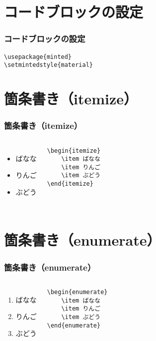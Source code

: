 \documentclass[t,aspectratio=169]{beamer}
\begin{document}
\section{コードブロックの設定}
\begin{frame}[fragile]
    \frametitle{コードブロックの設定}
    \begin{verbatim}
\usepackage{minted}
\setmintedstyle{material}
    \end{verbatim}
\end{frame}

\section{箇条書き（itemize）}
\begin{frame}[fragile]
    \frametitle{箇条書き（itemize）}
    \begin{columns}
        \begin{itemize}
            \item ばなな
            \item りんご
            \item ぶどう
        \end{itemize}
        \begin{verbatim}
\begin{itemize}
    \item ばなな
    \item りんご
    \item ぶどう
\end{itemize}
        \end{verbatim}
    \end{columns}
\end{frame}

\section{箇条書き（enumerate）}
\begin{frame}[fragile]
    \frametitle{箇条書き（enumerate）}
    \begin{columns}
        \begin{enumerate}
            \item ばなな
            \item りんご
            \item ぶどう
        \end{enumerate}
        \begin{verbatim}
\begin{enumerate}
    \item ばなな
    \item りんご
    \item ぶどう
\end{enumerate}
        \end{verbatim}
    \end{columns}
\end{frame}
\end{document}
